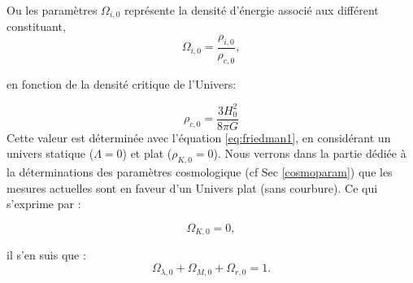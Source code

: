 Ou les paramètres $\Omega_{i,0}$ représente la densité d'énergie associé aux différent constituant, 
\begin{equation}
 \Omega_{i,0} = \frac{\rho_{i,0}}{\rho_{c,0}},
 \end{equation}

en fonction de la densité critique de l'Univers:

\begin{equation}
\rho_{c,0} = \frac{3H_0^2}{8\pi G}
 \end{equation}
Cette valeur est déterminée avec l'équation \ref{eq:friedman1}, en considérant un univers statique ($\Lambda=0$) et plat ($\rho_{K,0}=0$).
Nous verrons dans la partie dédiée à la déterminations des paramètres cosmologique (cf Sec \ref{cosmoparam}) que les mesures actuelles sont en faveur d'un Univers plat (sans courbure).
Ce qui s'exprime par :

\begin{equation}
\Omega_{K,0} = 0,
\end{equation}

il s'en suis que :
\begin{equation}
\Omega_{\lambda,0} +  \Omega_{M,0} + \Omega_{r,0} =1 .
\end{equation}


